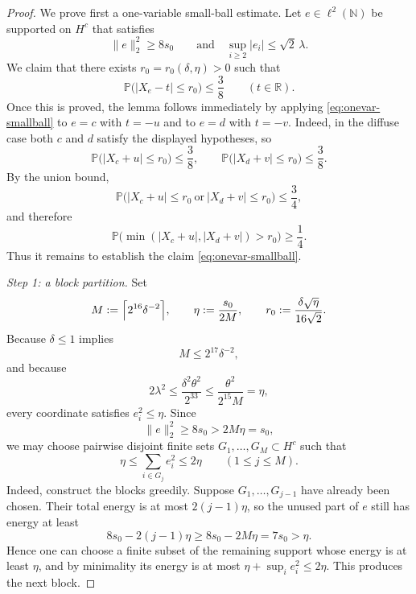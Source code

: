 \documentclass[11pt]{amsart}
\numberwithin{equation}{section}
\theoremstyle{definition}
\theoremstyle{remark}
\newcommand{\Prob}{\mathbb P}
\newcommand{\N}{\mathbb N}
\newcommand{\R}{\mathbb R}
\newcommand{\abs}[1]{\lvert #1 \rvert}
\newcommand{\norm}[1]{\lVert #1 \rVert}
\begin{document}
\begin{proof}
We prove first a one-variable small-ball estimate.  Let $e\in \ell^2(\N)$ be
supported on $H^c$ that satisfies
\[
\norm{e}_2^2\ge 8s_0
\qquad \text{and} \quad
\sup_{i\ge2}\abs{e_i}\le \sqrt2\,\lambda.
\]
	We claim that there exists $r_0=r_0(\delta,\eta)>0$ such that
\begin{equation}\label{eq:onevar-smallball}
\Prob\bigl(\abs{X_e-t}\le r_0\bigr)\le \frac38
\qquad(t\in\R).
\end{equation}
Once this is proved, the lemma follows immediately by applying
\eqref{eq:onevar-smallball} to $e=c$ with $t=-u$ and to $e=d$ with $t=-v$.
Indeed, in the diffuse case both $c$ and $d$ satisfy the displayed
hypotheses, so
\[
\Prob\bigl(\abs{X_c+u}\le r_0\bigr)\le \frac38,
\qquad
\Prob\bigl(\abs{X_d+v}\le r_0\bigr)\le \frac38.
\]
By the union bound,
\[
\Prob\bigl(\abs{X_c+u}\le r_0\ \text{or}\ \abs{X_d+v}\le r_0\bigr)
\le \frac34,
\]
and therefore
\[
\Prob\bigl(\min(\abs{X_c+u},\abs{X_d+v})>r_0\bigr)\ge \frac14.
\]
Thus it remains to establish the claim \eqref{eq:onevar-smallball}.

\smallskip
\noindent\emph{Step 1: a block partition.}
Set
\[
M:=\Bigl\lceil 2^{16}\delta^{-2}\Bigr\rceil,
\qquad
\eta:=\frac{s_0}{2M},
\qquad
r_0:=\frac{\delta\sqrt{\eta}}{16\sqrt{2}}.
\]
	Because $\delta\le1$ implies
	\[
	M\le 2^{17}\delta^{-2},
	\]
	and because
	\[
	2\lambda^2
	\le \frac{\delta^2\theta^2}{2^{33}}
	\le \frac{\theta^2}{2^{15}M}
	=\eta,
	\]
	every coordinate satisfies $e_i^2\le \eta$.  Since
\[
\norm{e}_2^2\ge 8s_0>2M\eta=s_0,
\]
we may choose pairwise disjoint finite sets $G_1,\dots,G_M\subset H^c$ such
that
\begin{equation}\label{eq:block-energy}
\eta\le \sum_{i\in G_j} e_i^2\le 2\eta
\qquad(1\le j\le M).
\end{equation}
Indeed, construct the blocks greedily.  Suppose $G_1,\dots,G_{j-1}$ have
already been chosen.  Their total energy is at most $2(j-1)\eta$, so the
unused part of $e$ still has energy at least
\[
8s_0-2(j-1)\eta\ge 8s_0-2M\eta=7s_0> \eta.
\]
Hence one can choose a finite subset of the remaining support whose energy is
at least $\eta$, and by minimality its energy is at most $\eta+\sup_i e_i^2
\le 2\eta$.  This produces the next block.


\end{proof}
\end{document}
